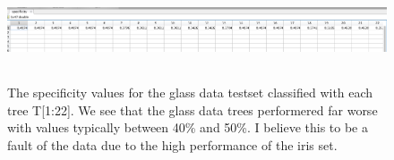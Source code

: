 \documentclass{article}
\begin{document}
 \begin{figure}[H]
    \centerline
    {\includegraphics[width=12cm, height=3cm]{GlassData_specificity.png}
    }
    \caption{\label{fig:my figure}The specificity values for the glass data testset classified with each tree T[1:22]. We see that the glass data trees performered far worse with values typically between 40\% and 50\%.  I believe this to be a fault of the data due to the high performance of the iris set.   }
\end{figure}
\end{document}
